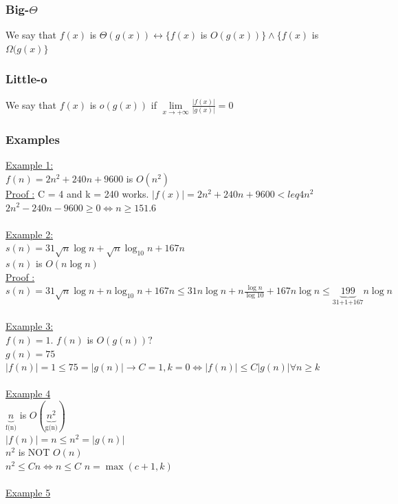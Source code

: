 \documentclass[12pt,a4paper]{article}
\begin{document}
\subsubsection{Big-$\Theta$}
We say that $f(x)$ is $\Theta(g(x)) \leftrightarrow \{f(x)$ is $O(g(x))\} \wedge \{f(x)$ is $\Omega(g(x)\}$

\subsubsection{Little-o}
We say that $f(x)$ is $o(g(x))$ if $\lim\limits_{x \to +\infty}\frac{|f(x)|}{|g(x)|} = 0$

\subsubsection{Examples}
\underline{Example 1:}\\
$f(n) = 2n^2 + 240 n + 9600$ is $O(n^2)$\\
\underline{Proof :} C = 4 and k = 240 works. $|f(x)| = 2n^2 + 240n + 9600  <leq 4n^2$\\
$2n^2 - 240n - 9600 \geq 0 \Leftrightarrow n \geq 151.6$\\
\\
\underline{Example 2:}\\
$s(n) = 31\sqrt{n}\log n + \sqrt{n}\log_{10} n +167n$ \\
$s(n)$ is $O(n\log n)$\\
\underline{Proof :} $s(n) = 31 \sqrt{n} \log n + n \log_{10}n + 167n \leq 31n \log n + n \frac{\log n}{\log 10} + 167 n \log n \leq \underbrace{199}_\text{31+1+167}n\log n$\\
\\
\underline{Example 3:}\\
$f(n) = 1$. $f(n)$ is $O(g(n)) ?$\\
$g(n) = 75$\\
$|f(n)| = 1 \leq 75 = |g(n)| \to C = 1, k = 0 \Leftrightarrow |f(n)| \leq C|g(n)| \forall n \geq k$\\
\\
\underline{Example 4}\\
$\underbrace{n}_\text{f(n)}$ is $O(\underbrace{n^2}_\text{g(n)})$\\
$|f(n)| = n \leq n^2 = |g(n)|$\\
$n^2$ is NOT $O(n)$\\
$n^2 \leq Cn \Leftrightarrow n \leq C$
$n = \max(c+1,k)$\\
\\
\underline{Example 5}
\end{document}
